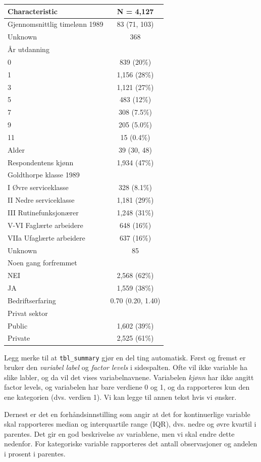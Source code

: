 \documentclass[
  letterpaper,
  DIV=11,
  numbers=noendperiod]{scrreprt}
\theoremstyle{definition}
\theoremstyle{remark}
\begin{document}
\begin{longtable}[]{@{}lc@{}}
\toprule()
\textbf{Characteristic} & \textbf{N = 4,127} \\
\midrule()
\endhead
Gjennomsnittlig timelønn 1989 & 83 (71, 103) \\
Unknown & 368 \\
År utdanning & \\
0 & 839 (20\%) \\
1 & 1,156 (28\%) \\
3 & 1,121 (27\%) \\
5 & 483 (12\%) \\
7 & 308 (7.5\%) \\
9 & 205 (5.0\%) \\
11 & 15 (0.4\%) \\
Alder & 39 (30, 48) \\
Respondentens kjønn & 1,934 (47\%) \\
Goldthorpe klasse 1989 & \\
I Øvre serviceklasse & 328 (8.1\%) \\
II Nedre serviceklasse & 1,181 (29\%) \\
III Rutinefunksjonærer & 1,248 (31\%) \\
V-VI Faglærte arbeidere & 648 (16\%) \\
VIIa Ufaglærte arbeidere & 637 (16\%) \\
Unknown & 85 \\
Noen gang forfremmet & \\
NEI & 2,568 (62\%) \\
JA & 1,559 (38\%) \\
Bedriftserfaring & 0.70 (0.20, 1.40) \\
Privat sektor & \\
Public & 1,602 (39\%) \\
Private & 2,525 (61\%) \\
\bottomrule()
\end{longtable}

Legg merke til at \texttt{tbl\_summary} gjør en del ting automatisk.
Først og fremst er bruker den \emph{variabel label} og \emph{factor
levels} i sidespalten. Ofte vil ikke variable ha slike labler, og da vil
det vises variabelnavnene. Variabelen \emph{kjønn} har ikke angitt
factor levels, og variabelen har bare verdiene 0 og 1, og da rapporteres
kun den ene kategorien (dvs. verdien 1). Vi kan legge til annen tekst
hvis vi ønsker.

Dernest er det en forhåndsinnstilling som angir at det for kontinuerlige
variable skal rapporteres median og interquartile range (IQR), dvs.
nedre og øvre kvartil i parentes. Det gir en god beskrivelse av
variablene, men vi skal endre dette nedenfor. For kategoriske variable
rapporteres det antall observasjoner og andelen i prosent i parentes.
\end{document}
